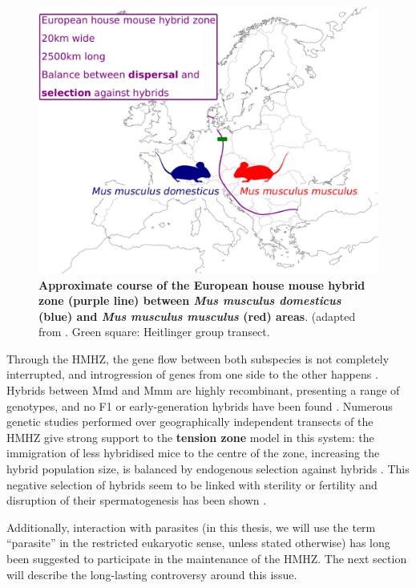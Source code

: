 \begin{figure}[H]
    \centering
    \includegraphics[width=.7\linewidth,height=\textheight,keepaspectratio]{images/1introduction/Figure1.pdf}
    \caption{\textbf{Approximate course of the European house mouse hybrid zone (purple line) between \textit{Mus musculus domesticus} (blue) and \textit{Mus musculus musculus} (red) areas}. (adapted from \cite{baird_where_2012}. Green square: Heitlinger group transect.}
\end{figure}

Through the HMHZ, the gene flow between both subspecies is not completely interrupted, and introgression of genes from one side to the other happens \citep{macholan_genetic_2007, macholan_assessing_2011, macholan_widespread_2019, raufaste_inferences_2005}. Hybrids between Mmd and Mmm are highly recombinant, presenting a range of genotypes, and no F1 or early-generation hybrids have been found \citep{macholan_genetic_2007}. Numerous genetic studies performed over geographically independent transects of the HMHZ \parencite[e.g.][]{macholan_genetic_2007, payseur_differential_2004, raufaste_inferences_2005} give strong support to the \textbf{tension zone} model in this system: the immigration of less hybridised mice to the centre of the zone, increasing the hybrid population size, is balanced by endogenous selection against hybrids \citep{baird_what_2012, barton_analysis_1985, boursot_evolution_1993}. This negative selection of hybrids seem to be linked with sterility or fertility \citep{baird_what_2012} and disruption of their spermatogenesis has been shown \citep{albrechtova_sperm-related_2012, martincova_sperm_2019, turner_reduced_2012, turner_genome-wide_2014}.
\par
Additionally, interaction with parasites (in this thesis, we will use the term “parasite” in the restricted eukaryotic sense, unless stated otherwise) has long been suggested to participate in the maintenance of the HMHZ. The next section will describe the long-lasting controversy around this issue.

